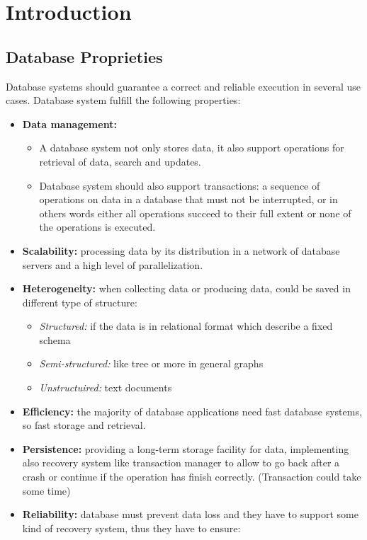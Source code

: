 \chapter{Introduction}
\section{Database Proprieties}
Database systems should guarantee a correct and reliable execution
in several use cases. Database system fulfill the following properties:
\begin{itemize}
    \item \textbf{Data management:} 
    \begin{itemize}
        \item A database system not only stores data, it also support operations for retrieval of data, search and updates. 
        \item Database system should also support transactions: a sequence of operations on data in a database that must not be interrupted, or in others words either all operations succeed to their full extent or none of the operations is executed.
    \end{itemize}
    \item \textbf{Scalability:} processing data by its distribution in a network of database servers and a high level of parallelization.
    \item \textbf{Heterogeneity:} when collecting data or producing data, could be saved in different type of structure:
    \begin{itemize}
        \item \textit{Structured:} if the data is in relational format which describe a fixed schema
        \item \textit{Semi-structured:} like tree or more in general graphs
        \item \textit{Unstructuired:} text documents
    \end{itemize}
    \item \textbf{Efficiency:} the majority of database applications need fast database systems, so fast storage and retrieval.
    \item \textbf{Persistence:} providing a long-term storage facility for data, implementing also recovery system like transaction manager to allow to go back after a crash or continue if the operation has finish correctly. (Transaction could take some time)
    \item \textbf{Reliability:} database must prevent data loss and they have to support some kind of recovery system, thus they have to ensure:

\end{itemize}

